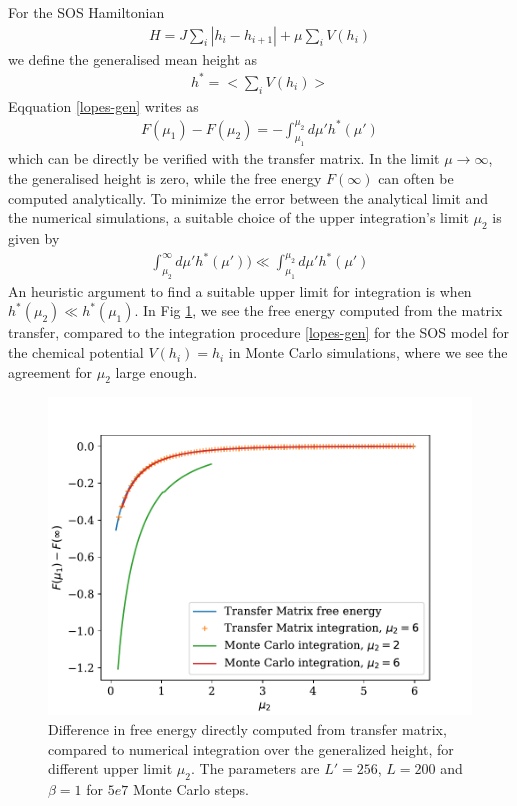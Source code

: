 {For the SOS Hamiltonian
\begin{align}
    H =  J \sum_i |h_i -h_{i+1}|  + \mu \sum_i V(h_i)
\end{align}
we define the generalised mean height as
\begin{align}
    h^\ast = < \sum_i V(h_i) >
\end{align}
Eqquation \eqref{lopes-gen} writes as
\begin{align}
   F(\mu_1) - F(\mu_2) = -  \int_{\mu_1}^{\mu_2} d\mu' h^\ast(\mu')
   \label{diff-gene}
\end{align}
which can be directly be verified with the transfer matrix. 
In the limit $\mu \to \infty$, the generalised height is zero, while the free energy $F(\infty)$ can often be computed analytically. 
To minimize the error between the analytical limit and the numerical simulations, a suitable choice of the upper integration's limit $\mu_2$ is given by
\begin{align}
    \int_{\mu_2}^\infty  d\mu' h^\ast(\mu')) \ll \int_{\mu_1}^{\mu_2}  d\mu' h^\ast(\mu')
\end{align}
An heuristic argument to find a suitable upper limit for integration is when $h^\ast(\mu_2) \ll h^\ast(\mu_1)$.
In Fig \ref{integration-free-ene}, we see the free energy computed from the matrix transfer, compared to the integration procedure \eqref{lopes-gen} for the SOS model for the chemical potential $V(h_i)=h_i$ in Monte Carlo simulations, where we see the agreement for $\mu_2$ large enough.

\begin{figure}
    \centering
    \includegraphics[width=0.7\linewidth]{int-dyn/integration-free-ene.pdf}
    \caption{Difference in free energy directly computed from transfer matrix, compared to numerical integration over the generalized height, for different upper limit $\mu_2$. The parameters are $L' = 256$, $L=200$ and $\beta=1$ for $5e7$ Monte Carlo steps.}
    \label{integration-free-ene}
\end{figure}

}
